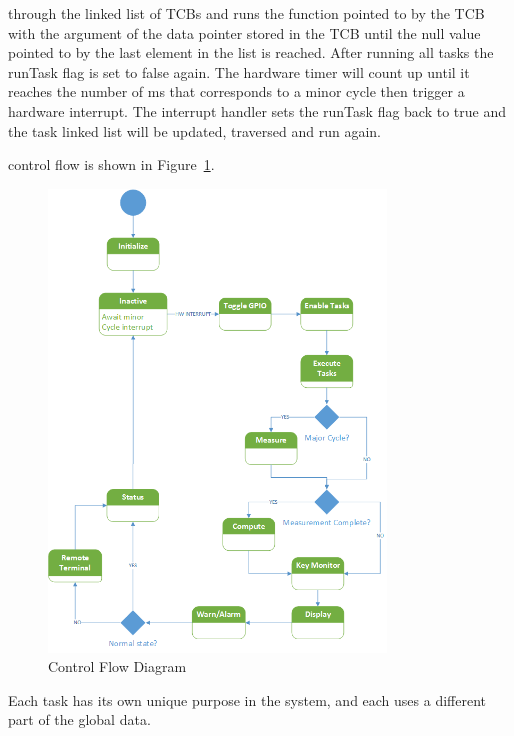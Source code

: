 \documentclass[12pt]{article} %
\begin{document}
    through the linked list of TCBs and runs the function pointed to by the TCB with the
    argument of the data pointer stored in the TCB until the null value pointed to by the last element in the list is reached. After running all  tasks the
    runTask flag is set to false again. The hardware timer will count up until it reaches the number of ms that corresponds to a minor cycle then trigger a hardware interrupt. The interrupt handler sets the runTask flag back to true and the task linked list will be updated, traversed and run again.
    
    control flow is shown in Figure~\ref{fig:Control}. 

    \begin{figure}[h]
      \centering
      \includegraphics[width=0.8\textwidth]{design/Control_state_diagram.png}
      \caption{Control Flow Diagram}
      \label{fig:Control}
    \end{figure}

    Each task has its own unique purpose in the system, and each uses a different
    part of the global data.
\end{document}
